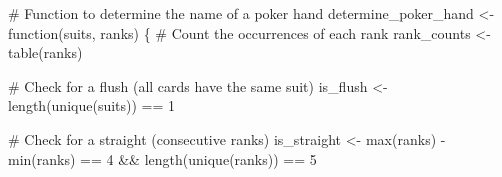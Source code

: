 \documentclass[
  letterpaper,
  DIV=11,
  numbers=noendperiod]{scrartcl}
\newenvironment{Shaded}{\begin{snugshade}}{\end{snugshade}}
\newcommand{\CommentTok}[1]{\textcolor[rgb]{0.37,0.37,0.37}{#1}}
\newcommand{\ControlFlowTok}[1]{\textcolor[rgb]{0.00,0.23,0.31}{#1}}
\newcommand{\DecValTok}[1]{\textcolor[rgb]{0.68,0.00,0.00}{#1}}
\newcommand{\FunctionTok}[1]{\textcolor[rgb]{0.28,0.35,0.67}{#1}}
\newcommand{\NormalTok}[1]{\textcolor[rgb]{0.00,0.23,0.31}{#1}}
\newcommand{\OtherTok}[1]{\textcolor[rgb]{0.00,0.23,0.31}{#1}}
\newcommand{\SpecialCharTok}[1]{\textcolor[rgb]{0.37,0.37,0.37}{#1}}
\begin{document}
\begin{Shaded}
\begin{Highlighting}[]
\CommentTok{\# Function to determine the name of a poker hand}
\NormalTok{determine\_poker\_hand }\OtherTok{\textless{}{-}} \ControlFlowTok{function}\NormalTok{(suits, ranks) \{}
  \CommentTok{\# Count the occurrences of each rank}
\NormalTok{  rank\_counts }\OtherTok{\textless{}{-}} \FunctionTok{table}\NormalTok{(ranks)}
  
  \CommentTok{\# Check for a flush (all cards have the same suit)}
\NormalTok{  is\_flush }\OtherTok{\textless{}{-}} \FunctionTok{length}\NormalTok{(}\FunctionTok{unique}\NormalTok{(suits)) }\SpecialCharTok{==} \DecValTok{1}
  
  \CommentTok{\# Check for a straight (consecutive ranks)}
\NormalTok{  is\_straight }\OtherTok{\textless{}{-}} \FunctionTok{max}\NormalTok{(ranks) }\SpecialCharTok{{-}} \FunctionTok{min}\NormalTok{(ranks) }\SpecialCharTok{==} \DecValTok{4} \SpecialCharTok{\&\&} \FunctionTok{length}\NormalTok{(}\FunctionTok{unique}\NormalTok{(ranks)) }\SpecialCharTok{==} \DecValTok{5}
  

\end{Highlighting}
\end{Shaded}
\end{document}
